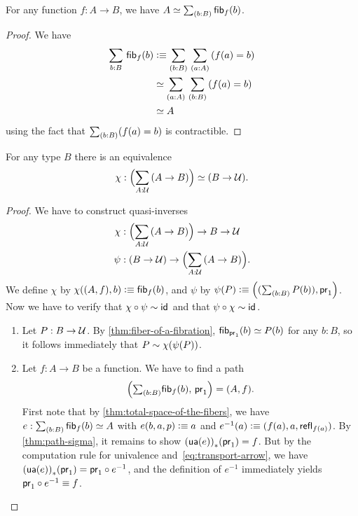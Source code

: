 \begin{lem}\label{thm:total-space-of-the-fibers}
  For any function $f:A\to B$, we have $\eqv{A}{\sm{b:B}\hfib{f}{b}}$.
\end{lem}
\begin{proof}
  We have
  \begin{align*}
    \sm{b:B}\hfib{f}{b} &\defeq \sm{b:B}{a:A} (f(a)=b)\\
    &\eqvsym \sm{a:A}{b:B} (f(a)=b)\\
    &\eqvsym A
  \end{align*}
  using the fact that $\sm{b:B} (f(a)=b)$ is contractible.
\end{proof}

\begin{thm}\label{thm:nobject-classifier-appetizer}
For any type $B$ there is an equivalence
\begin{equation*}
\chi:\Parens{\sm{A:\type} (A\to B)}\eqvsym (B\to\type).
\end{equation*}
\end{thm}
\begin{proof}
We have to construct quasi-inverses
\begin{align*}
\chi & : \Parens{\sm{A:\type} (A\to B)}\to B\to\type\\
\psi & : (B\to\type)\to\Parens{\sm{A:\type} (A\to B)}.
\end{align*}
We define $\chi$ by $\chi((A,f),b)\vcentcolon\equiv{\mathsf{fib}}_{f}(b)$, and $\psi$ by $\psi(P)\defeq\Pairr{(\sm{b:B} P(b)),\proj1}$.
Now we have to verify that $\chi\circ\psi\sim\mathsf{id}_{}{}$ and that $\psi\circ\chi \sim\mathsf{id}_{}{}$.
\begin{enumerate}
\item Let $P:B\to\mathcal{U}$.
  By \cref{thm:fiber-of-a-fibration},
${\mathsf{fib}}_{\mathsf{pr}_{1}}(b)\simeq P(b)$ for any $b:B$, so it follows immediately
that $P\sim\chi(\psi(P))$.
\item Let $f:A\to B$ be a function. We have to find a path
\begin{equation*}
\Pairr{\tsm{b:B} \hfiber{f}b,\,\proj1}=\pairr{A,f}.
\end{equation*}
First note that by \cref{thm:total-space-of-the-fibers}, we have
$e:\sm{b:B} \hfiber{f}b\eqvsym A$ with $e(b,a,p)\vcentcolon\equiv a$ and $e^{-1}(a)
\vcentcolon\equiv(f(a),a,\mathsf{refl}_{f(a)})$.
By \cref{thm:path-sigma}, it remains to show ${(\mathsf{ua}(e))}_{*}\mathopen{}\left({\mathsf{pr}_{1}}\right)\mathclose{} = f$.
But by the computation rule for univalence and~\eqref{eq:transport-arrow}, we have ${(\mathsf{ua}(e))}_{*}\mathopen{}\left({\mathsf{pr}_{1}}\right)\mathclose{} = \mathsf{pr}_{1}\circ e^{-1}$, and the definition of $e^{-1}$ immediately yields $\mathsf{pr}_{1} \circ e^{-1} \equiv f$.\qedhere
\end{enumerate}
\end{proof}

